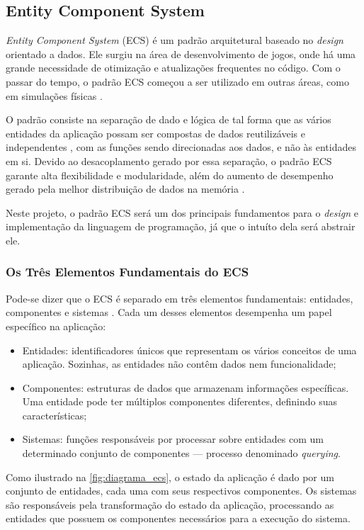 \subsection{Entity Component System}

\textit{Entity Component System} (ECS) é um padrão arquitetural baseado no \textit{design} orientado a dados. Ele surgiu na área de desenvolvimento de jogos, onde há uma grande necessidade de otimização e atualizações frequentes no código. Com o passar do tempo, o padrão ECS começou a ser utilizado em outras áreas, como em simulações físicas \cite{flightdynamics}.

O padrão consiste na separação de dado e lógica de tal forma que as vários entidades da aplicação possam ser compostas de dados reutilizáveis e independentes \cite{ecsfaq}, com as funções sendo direcionadas aos dados, e não às entidades em si. Devido ao desacoplamento gerado por essa separação, o padrão ECS garante alta flexibilidade e modularidade, além do aumento de desempenho gerado pela melhor distribuição de dados na memória \cite{ecsstorageinpics}.

Neste projeto, o padrão ECS será um dos principais fundamentos para o \textit{design} e implementação da linguagem de programação, já que o intuíto dela será abstrair ele.

\subsubsection{Os Três Elementos Fundamentais do ECS}

Pode-se dizer que o ECS é separado em três elementos fundamentais: entidades, componentes e sistemas \cite{ecsfaq}. Cada um desses elementos desempenha um papel específico na aplicação:

\begin{itemize}
	\item Entidades: identificadores únicos que representam os vários conceitos de uma aplicação. Sozinhas, as entidades não contêm dados nem funcionalidade;
	\item Componentes: estruturas de dados que armazenam informações específicas. Uma entidade pode ter múltiplos componentes diferentes, definindo suas características;
	\item Sistemas: funções responsáveis por processar sobre entidades com um determinado conjunto de componentes — processo denominado \textit{querying}.
\end{itemize}

Como ilustrado na \autoref{fig:diagrama_ecs}, o estado da aplicação é dado por um conjunto de entidades, cada uma com seus respectivos componentes. Os sistemas são responsáveis pela transformação do estado da aplicação, processando as entidades que possuem os componentes necessários para a execução do sistema.

